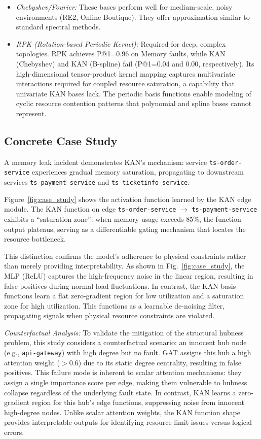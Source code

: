 \documentclass[conference]{IEEEtran}
\begin{document}
\begin{itemize}
    \item \textit{Chebyshev/Fourier:} These bases perform well for medium-scale, noisy environments (RE2, Online-Boutique). They offer approximation similar to standard spectral methods.
    \item \textit{RPK (Rotation-based Periodic Kernel):} Required for deep, complex topologies. RPK achieves P@1=0.96 on Memory faults, while KAN (Chebyshev) and KAN (B-spline) fail (P@1=0.04 and 0.00, respectively). Its high-dimensional tensor-product kernel mapping captures multivariate interactions required for coupled resource saturation, a capability that univariate KAN bases lack. The periodic basis functions enable modeling of cyclic resource contention patterns that polynomial and spline bases cannot represent.
\end{itemize}

\subsection{Concrete Case Study}

A memory leak incident demonstrates KAN's mechanism: service \texttt{ts-order-service} experiences gradual memory saturation, propagating to downstream services \texttt{ts-payment-service} and \texttt{ts-ticketinfo-service}.

Figure~\ref{fig:case_study} shows the activation function learned by the KAN edge module. The KAN function on edge \texttt{ts-order-service} $\to$ \texttt{ts-payment-service} exhibits a ``saturation zone'': when memory usage exceeds 85\%, the function output plateaus, serving as a differentiable gating mechanism that locates the resource bottleneck. 

This distinction confirms the model's adherence to physical constraints rather than merely providing interpretability. As shown in Fig.~\ref{fig:case_study}, the MLP (ReLU) captures the high-frequency noise in the linear region, resulting in false positives during normal load fluctuations. In contrast, the KAN basis functions learn a flat zero-gradient region for low utilization and a saturation zone for high utilization. This functions as a learnable de-noising filter, propagating signals when physical resource constraints are violated. 

\textit{Counterfactual Analysis:} To validate the mitigation of the structural hubness problem, this study considers a counterfactual scenario: an innocent hub node (e.g., \texttt{api-gateway}) with high degree but no fault. GAT assigns this hub a high attention weight ($>0.6$) due to its static degree centrality, resulting in false positives. This failure mode is inherent to scalar attention mechanisms: they assign a single importance score per edge, making them vulnerable to hubness collapse regardless of the underlying fault state. In contrast, KAN learns a zero-gradient region for this hub's edge functions, suppressing noise from innocent high-degree nodes. Unlike scalar attention weights, the KAN function shape provides interpretable outputs for identifying resource limit issues versus logical errors.
\end{document}
